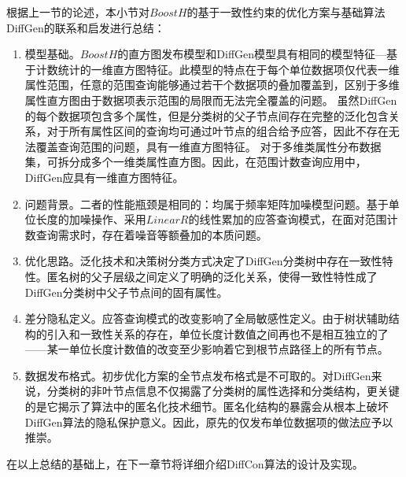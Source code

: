 根据上一节的论述，本小节对$BoostH$的基于一致性约束的优化方案与基础算法DiffGen的联系和启发进行总结：
\begin{enumerate}
	\item 模型基础。$BoostH$的直方图发布模型和DiffGen模型具有相同的模型特征---基于计数统计的一维直方图特征。此模型的特点在于每个单位数据项仅代表一维属性范围，任意的范围查询能够通过若干个数据项的叠加覆盖到，区别于多维属性直方图由于数据项表示范围的局限而无法完全覆盖的问题。
	虽然DiffGen的每个数据项包含多个属性，但是分类树的父子节点间存在完整的泛化包含关系，对于所有属性区间的查询均可通过叶节点的组合给予应答，因此不存在无法覆盖查询范围的问题，具有一维直方图特征。
	对于多维类属性分布数据集，可拆分成多个一维类属性直方图。因此，在范围计数查询应用中，DiffGen应具有一维直方图特征。
	\item 问题背景。二者的性能瓶颈是相同的：均属于频率矩阵加噪模型问题。基于单位长度的加噪操作、采用$LinearR$的线性累加的应答查询模式，在面对范围计数查询需求时，存在着噪音等额叠加的本质问题。
	\item 优化思路。泛化技术和决策树分类方式决定了DiffGen分类树中存在一致性特性。匿名树的父子层级之间定义了明确的泛化关系，使得一致性特性成了DiffGen分类树中父子节点间的固有属性。
	\item 差分隐私定义。应答查询模式的改变影响了全局敏感性定义。由于树状辅助结构的引入和一致性关系的存在，单位长度计数值之间再也不是相互独立的了——某一单位长度计数值的改变至少影响着它到根节点路径上的所有节点。
	\item 数据发布格式。初步优化方案的全节点发布格式是不可取的。对DiffGen来说，分类树的非叶节点信息不仅揭露了分类树的属性选择和分类结构，更关键的是它揭示了算法中的匿名化技术细节。匿名化结构的暴露会从根本上破坏DiffGen算法的隐私保护意义。因此，原先的仅发布单位数据项的做法应予以推崇。
	
\end{enumerate}

在以上总结的基础上，在下一章节将详细介绍DiffCon算法的设计及实现。